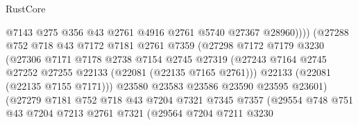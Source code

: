 \begin{lexlean}{RustCore}
\begin{coremodule}
                                    @7143
                                    @275
                                    @356
                                    @43
                                    @2761
                                    @4916
                                    @2761
                                    @5740
                                    @27367
                                    @28960))))
                            (@27288
                              @752
                              @718
                              @43
                              @7172
                              @7181
                              @2761
                              @7359
                              (@27298
                                @7172
                                @7179
                                @3230
                                (@27306
                                  @7171
                                  @7178
                                  @2738
                                  @7154
                                  @2745
                                  @27319
                                  (@27243
                                    @7164
                                    @2745
                                    @27252
                                    @27255
                                    @22133
                                    (@22081 (@22135 @7165 @2761)))
                                  @22133
                                  (@22081 (@22135 @7155 @7171)))
                                @23580
                                @23583
                                @23586
                                @23590
                                @23595
                                @23601)
                              (@27279
                                @7181
                                @752
                                @718
                                @43
                                @7204
                                @7321
                                @7345
                                @7357
                                (@29554
                                  @748
                                  @751
                                  @43
                                  @7204
                                  @7213
                                  @2761
                                  @7321
                                  (@29564
                                    @7204
                                    @7211
                                    @3230

\end{coremodule}
\end{lexlean}
